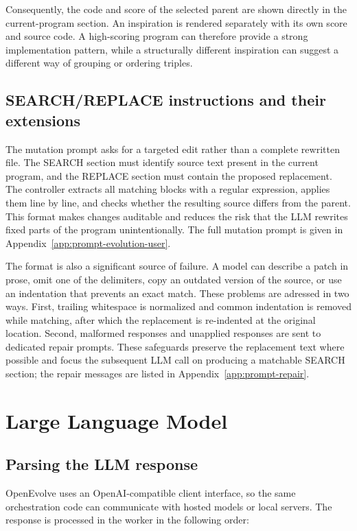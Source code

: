 Consequently, the code and score of the selected parent are shown directly in
the current-program section. An inspiration is rendered separately with its
own score and source code. A high-scoring program can therefore provide a
strong implementation pattern, while a structurally different inspiration can
suggest a different way of grouping or ordering triples.

\subsection{SEARCH/REPLACE instructions and their extensions}

The mutation prompt asks for a targeted edit rather than a complete rewritten
file. The SEARCH section must identify source text present in the current
program, and the REPLACE section must contain the proposed replacement. The
controller extracts all matching blocks with a regular expression, applies
them line by line, and checks whether the resulting source differs from the
parent. This format makes changes auditable and reduces the risk that the LLM
rewrites fixed parts of the program unintentionally. The full mutation prompt
is given in Appendix~\ref{app:prompt-evolution-user}.

The format is also a significant source of failure. A model can describe a
patch in prose, omit one of the delimiters, copy an outdated version of the
source, or use an indentation that prevents an exact match. These problems
are adressed in two ways. First, trailing whitespace
is normalized and common indentation is removed while matching, after which
the replacement is re-indented at the original location. Second, malformed
responses and unapplied responses are sent to dedicated repair prompts. These
safeguards preserve the replacement text where possible and focus the subsequent
LLM call on producing a matchable SEARCH section; the repair messages are
listed in Appendix~\ref{app:prompt-repair}.

\section{Large Language Model}
\label{sec:large-language-model}

\subsection{Parsing the LLM response}

OpenEvolve uses an OpenAI-compatible client interface, so the same orchestration
code can communicate with hosted models or local servers. The response is
processed in the worker in the following order:

